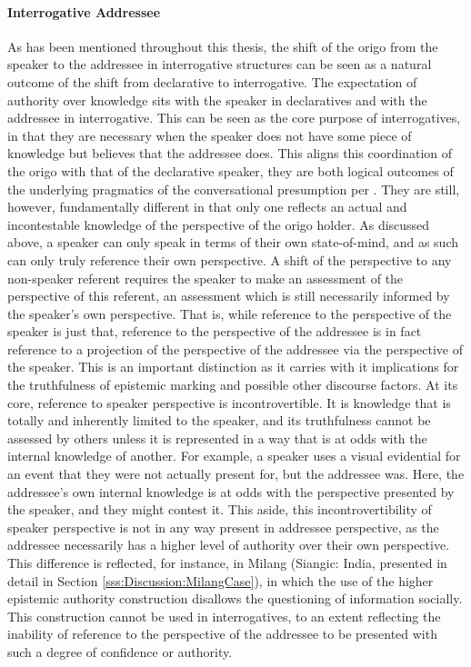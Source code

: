 \paragraph{Interrogative Addressee}
As has been mentioned throughout this thesis, the shift of the origo from the speaker to the addressee in interrogative structures can be seen as a natural outcome of the shift from declarative to interrogative. The expectation of authority over knowledge sits with the speaker in declaratives and with the addressee in interrogative. This can be seen as the core purpose of interrogatives, in that they are necessary when the speaker does not have some piece of knowledge but believes that the addressee does. This aligns this coordination of the origo with that of the declarative speaker, they are both logical outcomes of the underlying pragmatics of the conversational presumption per \cite{Hill2020}. They are still, however, fundamentally different in that only one reflects an actual and incontestable knowledge of the perspective of the origo holder. As discussed above, a speaker can only speak in terms of their own state-of-mind, and as such can only truly reference their own perspective. A shift of the perspective to any non-speaker referent requires the speaker to make an assessment of the perspective of this referent, an assessment which is still necessarily informed by the speaker's own perspective. That is, while reference to the perspective of the speaker is just that, reference to the perspective of the addressee is in fact reference to a projection of the perspective of the addressee via the perspective of the speaker. This is an important distinction as it carries with it implications for the truthfulness of epistemic marking and possible other discourse factors. At its core, reference to speaker perspective is incontrovertible. It is knowledge that is totally and inherently limited to the speaker, and its truthfulness cannot be assessed by others unless it is represented in a way that is at odds with the internal knowledge of another. For example, a speaker uses a visual evidential for an event that they were not actually present for, but the addressee was. Here, the addressee's own internal knowledge is at odds with the perspective presented by the speaker, and they might contest it. This aside, this incontrovertibility of speaker perspective is not in any way present in addressee perspective, as the addressee necessarily has a higher level of authority over their own perspective. This difference is reflected, for instance, in Milang (Siangic: India, presented in detail in Section \ref{sss:Discussion:MilangCase}), in which the use of the higher epistemic authority construction disallows the questioning of information socially. This construction cannot be used in interrogatives, to an extent reflecting the inability of reference to the perspective of the addressee to be presented with such a degree of confidence or authority.
